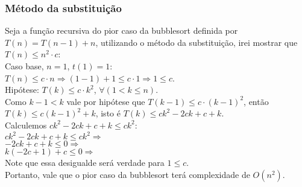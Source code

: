 \subsubsection{Método da substituição}
Seja a função recursiva do pior caso da bubblesort definida por $T(n) = T(n-1) + n$, utilizando o método da substituição, irei mostrar que $T(n) \le n^2 \cdot c$: \\
Caso base, $n = 1$, $t(1) = 1$: \\
$T(n) \le c \cdot n \Rightarrow (1 - 1) + 1 \le c \cdot 1 \Rightarrow 1 \le c$. \\
Hipótese: $T(k) \le c \cdot k^2$, $\forall (1 < k \le n)$. \\
Como $k - 1 < k$ vale por hipótese que $T(k - 1) \leq c \cdot (k-1)^2 $, então $T(k) \leq c (k-1)^2 + k$, isto é $T(k) \leq ck^2 - 2ck + c + k$. \\
Calculemos $ck^2 - 2ck + c + k \leq ck^2$:\\
$ck^2 - 2ck + c + k \leq ck^2 \Rightarrow$ \\
$-2ck + c + k \leq 0 \Rightarrow$ \\
$k(-2c + 1) + c \leq 0 \Rightarrow$ \\
Note que essa desigualde será verdade para $1 \leq c$. \\
Portanto, vale que o pior caso da bubblesort terá complexidade de $O(n^2)$.
